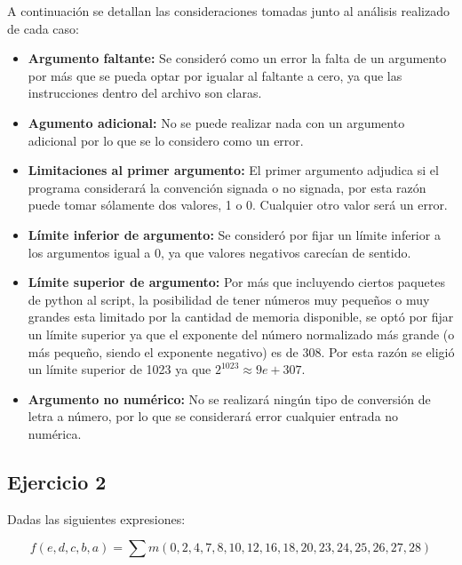 \documentclass[a4paper]{article}
\begin{document}
A continuación se detallan las consideraciones tomadas junto al análisis realizado de cada caso:
\begin{itemize}
\item \textbf{Argumento faltante:} Se consideró como un error la falta de un argumento por más que se pueda optar por igualar al faltante a cero, ya que las instrucciones dentro del archivo son claras.
\item \textbf{Agumento adicional:} No se puede realizar nada con un argumento adicional por lo que se lo considero como un error.
\item \textbf{Limitaciones al primer argumento:} El primer argumento adjudica si el programa considerará la convención signada o no signada, por esta razón puede tomar sólamente dos valores, 1 o 0. Cualquier otro valor será un error.
\item \textbf{Límite inferior de argumento:} Se consideró por fijar un límite inferior a los argumentos igual a 0, ya que valores negativos carecían de sentido.
\item \textbf{Límite superior de argumento:} Por más que incluyendo ciertos paquetes de python al script, la posibilidad de tener números muy pequeños o muy grandes esta limitado por la cantidad de memoria disponible, se optó por fijar un límite superior ya que el exponente del número normalizado más grande (o más pequeño, siendo el exponente negativo) es de 308. Por esta razón se eligió un límite superior de 1023 ya que $2^1023 \approx 9e+307$.
\item \textbf{Argumento no numérico:} No se realizará ningún tipo de conversión de letra a número, por lo que se considerará error cualquier entrada no numérica.

\end{itemize}

\subsection*{Ejercicio 2}

Dadas las siguientes expresiones:

\begin{equation}
f \left( e,d,c,b,a \right) = \sum m \left( 0,2,4,7,8,10,12,16,18,20,23,24,25,26,27,28 \right)
\label{equ:minterms}
\end{equation}
\end{document}
